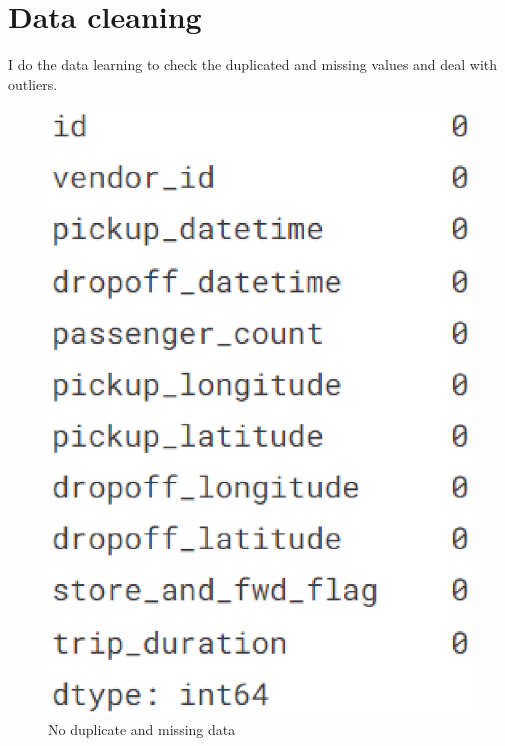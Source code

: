\vspace{8cm}
\section{Data cleaning} \label{sec-Data cleaning}
I do the data learning to check the duplicated and missing values and deal with outliers.
\begin{figure}[h]
	\centering
	\includegraphics[scale=0.3]{duplicate.eps}
	\caption{No duplicate and missing data}
\end{figure}

